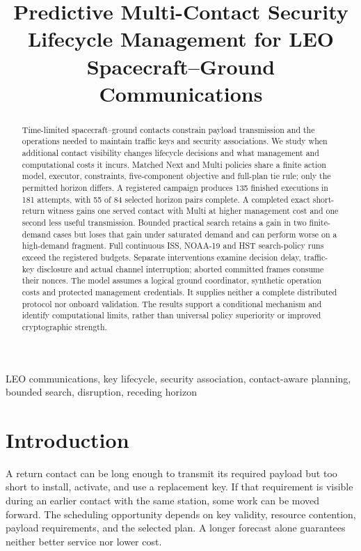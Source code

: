 \documentclass[conference]{IEEEtran}
\begin{document}
\title{Predictive Multi-Contact Security Lifecycle Management for LEO Spacecraft--Ground Communications}
\author{}
\maketitle

\begin{abstract}
Time-limited spacecraft--ground contacts constrain payload transmission and the operations needed to maintain traffic keys and security associations. We study when additional contact visibility changes lifecycle decisions and what management and computational costs it incurs. Matched Next and Multi policies share a finite action model, executor, constraints, five-component objective and full-plan tie rule; only the permitted horizon differs. A registered campaign produces 135 finished executions in 181 attempts, with 55 of 84 selected horizon pairs complete. A completed exact short-return witness gains one served contact with Multi at higher management cost and one second less useful transmission. Bounded practical search retains a gain in two finite-demand cases but loses that gain under saturated demand and can perform worse on a high-demand fragment. Full continuous ISS, NOAA-19 and HST search-policy runs exceed the registered budgets. Separate interventions examine decision delay, traffic-key disclosure and actual channel interruption; aborted committed frames consume their nonces. The model assumes a logical ground coordinator, synthetic operation costs and protected management credentials. It supplies neither a complete distributed protocol nor onboard validation. The results support a conditional mechanism and identify computational limits, rather than universal policy superiority or improved cryptographic strength.
\end{abstract}
\begin{IEEEkeywords}
LEO communications, key lifecycle, security association, contact-aware planning, bounded search, disruption, receding horizon
\end{IEEEkeywords}

\section{Introduction}
A return contact can be long enough to transmit its required payload but too short to install, activate, and use a replacement key. If that requirement is visible during an earlier contact with the same station, some work can be moved forward. The scheduling opportunity depends on key validity, resource contention, payload requirements, and the selected plan. A longer forecast alone guarantees neither better service nor lower cost.
\end{document}
